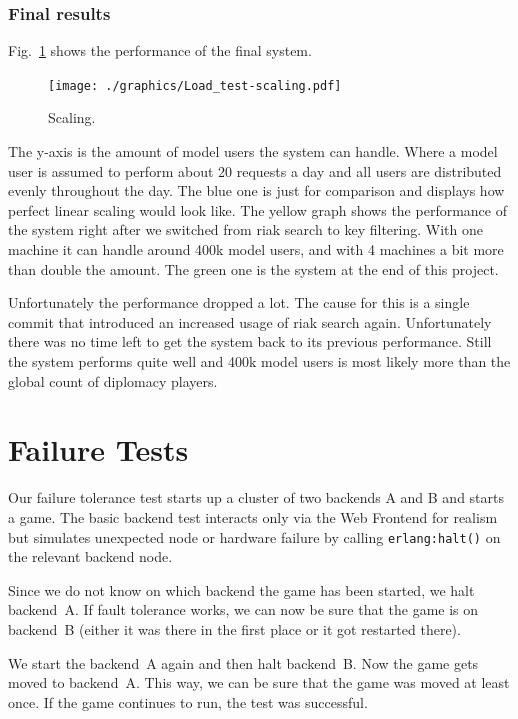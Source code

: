 \documentclass[11pt,a4paper]{report}
\begin{document}
\subsubsection{Final results}
Fig.~\ref{fig:load_test:scaling} shows the performance of the final system.
\begin{figure}[htbp!]
  \hspace{.5cm}
 \texttt{[image: ./graphics/Load\_test-scaling.pdf]}
 \vspace{-6cm}
 \caption{Scaling.}
 \label{fig:load_test:scaling}
\end{figure}
The y-axis is the amount of model users the system can handle.
Where a model user is assumed to perform about 20 requests a day and
all users are distributed evenly throughout the day.
The blue one is just for comparison and displays how perfect linear scaling would look like.
The yellow graph shows the performance of the system right after we switched from
riak search to key filtering.
With one machine it can handle around 400k model users, and with 4 machines
a bit more than double the amount.
The green one is the system at the end of this project.

Unfortunately the performance dropped a lot.
The cause for this is a single commit that introduced an increased usage of riak search again.
Unfortunately there was no time left to get the system back to its previous performance.
Still the system performs quite well and 400k model users is most likely
more than the global count of diplomacy players.


\section{Failure Tests}
Our failure tolerance test starts up a cluster of two backends A and B and
starts a game. The basic backend test interacts only via the Web Frontend
for realism but simulates unexpected node or hardware failure by calling
{\tt erlang:halt()} on the relevant backend node.

Since we do not know on which backend the game has been started, we halt
backend~A. If fault tolerance works, we can now be sure that the game is on
backend~B (either it was there in the first place or it got restarted there).

We start the backend~A again and then halt backend~B. Now the game gets moved to
backend~A. This way, we can be sure that the game was moved at least once.
If the game continues to run, the test was successful.
\end{document}
